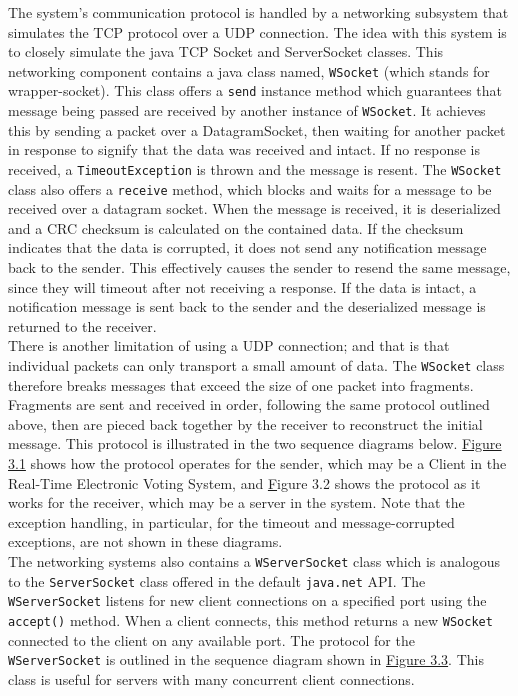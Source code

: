 \documentclass[11pt,english]{article}
\begin{document}
The system's communication protocol is handled by a networking subsystem that
simulates the TCP protocol over a UDP connection. The idea with this system
is to closely simulate the java TCP Socket and ServerSocket classes.
This networking component contains a
java class named, {\tt WSocket} (which stands for wrapper-socket). This class offers a
{\tt send} instance method which guarantees that message being passed are received by another
instance of {\tt WSocket}. It achieves this by sending a packet over a DatagramSocket, 
then waiting for another packet in response to signify that the data was received and intact. 
If no response is received, a {\tt TimeoutException} is thrown and the message is resent.
The {\tt WSocket} class also offers a {\tt receive} method, which blocks and waits for a message to be received
over a datagram socket. When the message is received, it is deserialized and a CRC
checksum is calculated on the contained data. If the checksum indicates that the data is
corrupted, it does not send any notification message back to the sender. This effectively
causes the sender to resend the same message, since they will timeout after not receiving
a response. If the data is intact, a notification message is sent back to the sender and
the deserialized message is returned to the receiver. 
\vspace{2mm}\\
There is another limitation of using a UDP connection; and that is that individual packets
can only transport a small amount of data. The {\tt WSocket} class therefore breaks messages
that exceed the size of one packet into fragments. Fragments are sent and received in order,
following the same protocol outlined above, then are pieced back together by the receiver
to reconstruct the initial message. This protocol is illustrated in the two sequence
diagrams below. \underline{Figure 3.1} shows how the protocol operates for the sender,
which may be a Client in the Real-Time Electronic Voting System, and {\underline Figure
3.2} shows the protocol as it works for
the receiver, which may be a server in the system. Note that the exception handling, in
particular, for the timeout and message-corrupted exceptions, are not shown in these
diagrams.
\vspace{2mm}\\
The networking systems also contains a {\tt WServerSocket} class which is analogous to the 
{\tt ServerSocket} class offered in the default {\tt java.net} API. The {\tt WServerSocket}
listens for new client connections on a specified port using the {\tt accept()} method.
When a client connects, this method returns a new {\tt WSocket} connected to the client
on any available port. The protocol for the {\tt WServerSocket} is outlined in the sequence diagram
shown in \underline{Figure 3.3}. This class is useful for servers with many concurrent client connections.
\end{document}
